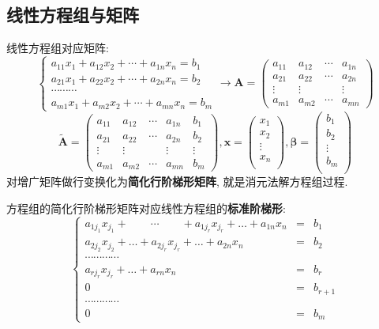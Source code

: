 \documentclass{article}
\begin{document}
		\subsection{线性方程组与矩阵}
			线性方程组对应矩阵:
			$$
			\left\{\begin{array}{c}
				a_{11} x_{1}+a_{12} x_{2}+\cdots+a_{1 n} x_{n}=b_{1} \\
				a_{21} x_{1}+a_{22} x_{2}+\cdots+a_{2 n} x_{n}=b_{2} \\
				\cdots \cdots \cdots \\
				a_{m 1} x_{1}+a_{m 2} x_{2}+\cdots+a_{m n} x_{n}=b_{m}
			\end{array}\right.
			\rightarrow
			\boldsymbol{A}=\left(\begin{array}{cccc}
				a_{11} & a_{12} & \cdots & a_{1 n} \\
				a_{21} & a_{22} & \cdots & a_{2 n} \\
				\vdots & \vdots & & \vdots \\
				a_{m 1} & a_{m 2} & \cdots & a_{m n}
			\end{array}\right)
			$$
			$$
			\tilde{\boldsymbol{A}}=
			\left(\begin{array}{ccccc}
				a_{11} & a_{12} & \cdots & a_{1 n} & b_{1} \\
				a_{21} & a_{22} & \cdots & a_{2 n} & b_{2} \\
				\vdots & \vdots & & \vdots & \vdots \\
				a_{m 1} & a_{m 2} & \cdots & a_{m n} & b_{m}
			\end{array}\right),
			\boldsymbol{x}=
			\left(\begin{array}{c}
				x_{1} \\
				x_{2} \\
				\vdots \\
				x_{n} \\
			\end{array}\right),
			\boldsymbol{\beta}=
			\left(\begin{array}{c}
			b_{1} \\
			b_{2} \\
			\vdots \\
			b_{m} \\
			\end{array}\right)
			$$
			对增广矩阵做行变换化为\textbf{简化行阶梯形矩阵}, 就是消元法解方程组过程.

			方程组的简化行阶梯形矩阵对应线性方程组的\textbf{标准阶梯形}:
			$$
			\left \{\begin{array}{rcl}
				a_{1j_1}x_{j_1}+\qquad \cdots \qquad +a_{1j_r}x_{j_r}+\dots +a_{1n}x_n & = & b_1 \\
				a_{2j_2}x_{j_2}+\dots +a_{2j_r}x_{j_r}+\dots +a_{2n}x_n & = & b_2 \\
				\cdots \cdots \cdots \cdots \\
				a_{rj_r}x_{j_r}+\dots +a_{rn}x_n & = & b_r \\
				0 & = & b_{r+1} \\
				\cdots \cdots \cdots \cdots \\
				0 & = & b_m
			\end{array}
			\right.$$
\end{document}
